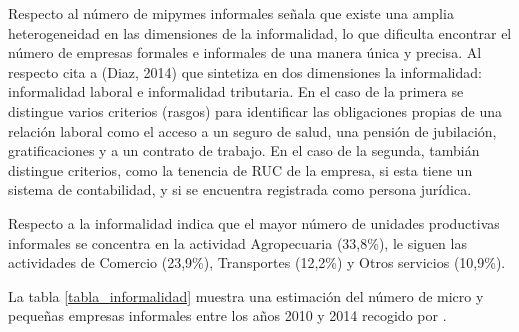 Respecto al n\'umero de mipymes informales \cite{produce2} se\~nala que existe una
amplia heterogeneidad en las dimensiones de la informalidad, lo que dificulta
encontrar el n\'umero de empresas formales e informales de una manera \'unica y precisa.
Al respecto \citep{produce2} cita a (Diaz, 2014) que sintetiza en dos dimensiones
la informalidad: informalidad laboral e informalidad tributaria. En el caso de la
primera se distingue varios criterios (rasgos) para identificar las obligaciones
propias de una relaci\'on laboral como el acceso a un seguro de salud, una pensi\'on
de jubilaci\'on, gratificaciones y a un contrato de trabajo. En el caso de la segunda,
tambi\'an distingue criterios, como la tenencia de RUC de la empresa, si esta tiene
un sistema de contabilidad, y si se encuentra registrada como persona jur\'idica.

Respecto a la informalidad \cite{inei2} indica que el mayor n\'umero de unidades
productivas informales se concentra en la actividad Agropecuaria (33,8\%), le
siguen las actividades de Comercio (23,9\%), Transportes (12,2\%) y Otros servicios (10,9\%).

La tabla \ref{tabla_informalidad} muestra una estimaci\'on del n\'umero de micro y
peque\~nas empresas informales entre los a\~nos 2010 y 2014 recogido por
\citep{produce2}.

